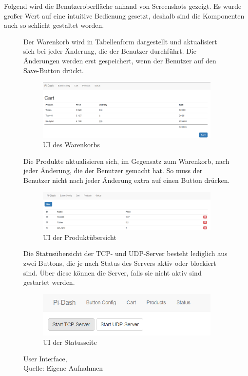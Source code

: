 Folgend wird die Benutzeroberfläche anhand von Screenshots gezeigt. Es wurde großer Wert auf eine intuitive Bedienung gesetzt, deshalb sind die Komponenten auch so schlicht gestaltet worden.
\begin{figure}[!htb]
	Der Warenkorb wird in Tabellenform dargestellt und aktualisiert sich bei jeder Änderung, die der Benutzer durchführt. Die Änderungen werden erst gespeichert, wenn der Benutzer auf den Save-Button drückt.	
  \begin{subfigure}{\linewidth}
	\centering
	\includegraphics[scale=0.4]{Bilder/ui_cart.png}
	\caption[UI des Warenkorbs]{UI des Warenkorbs}
  \end{subfigure}\par\medskip
Die Produkte aktualisieren sich, im Gegensatz zum Warenkorb, nach jeder Änderung, die der Benutzer gemacht hat. So muss der Benutzer nicht nach jeder Änderung extra auf einen Button drücken.
  \begin{subfigure}{\linewidth}	
	\centering
	\includegraphics[scale=0.4]{Bilder/ui_products.png}
	\caption[UI der Produktübersicht]{UI der Produktübersicht}
  \end{subfigure}\par\medskip
Die Statusübersicht der TCP- und UDP-Server besteht lediglich aus zwei Buttons, die je nach Status des Servers aktiv oder blockiert sind. Über diese können die Server, falls sie nicht aktiv sind gestartet werden.
  \begin{subfigure}{\linewidth}
	\centering
	\includegraphics[scale=0.8]{Bilder/ui_status.png}
	\caption[UI der Statusseite]{UI der Statusseite}
  \end{subfigure}
  \caption{User Interface,\\ Quelle: Eigene Aufnahmen}
\end{figure}

